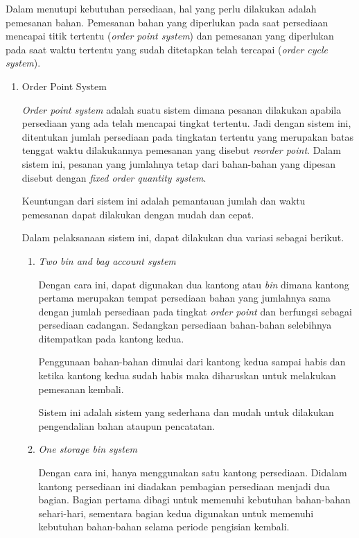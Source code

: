 Dalam menutupi kebutuhan persediaan, hal yang perlu dilakukan adalah pemesanan bahan. Pemesanan bahan yang diperlukan pada saat persediaan mencapai titik tertentu (\textit{order point system}) dan pemesanan yang diperlukan pada saat waktu tertentu yang sudah ditetapkan telah tercapai (\textit{order cycle system}).

\begin{enumerate}
	\item Order Point System
	

	\textit{Order point system} adalah suatu sistem dimana pesanan dilakukan apabila persediaan yang ada telah mencapai tingkat tertentu. Jadi dengan sistem ini, ditentukan jumlah persediaan pada tingkatan tertentu yang merupakan batas tenggat waktu dilakukannya pemesanan yang disebut \textit{reorder point}. Dalam sistem ini, pesanan yang jumlahnya tetap dari bahan-bahan yang dipesan disebut dengan \textit{fixed order quantity system}. 

	Keuntungan dari sistem ini adalah pemantauan jumlah dan waktu pemesanan dapat dilakukan dengan mudah dan cepat.

	Dalam pelaksanaan sistem ini, dapat dilakukan dua variasi sebagai berikut.

	\begin{enumerate}
		\item \textit{Two bin and bag account system}
		
		Dengan cara ini, dapat digunakan dua kantong atau \textit{bin} dimana kantong pertama merupakan tempat persediaan bahan yang jumlahnya sama dengan jumlah persediaan pada tingkat \textit{order point} dan berfungsi sebagai persediaan cadangan. Sedangkan persediaan bahan-bahan selebihnya ditempatkan pada kantong kedua.

		Penggunaan bahan-bahan dimulai dari kantong kedua sampai habis dan ketika kantong kedua sudah habis maka diharuskan untuk melakukan pemesanan kembali.

		Sistem ini adalah sistem yang sederhana dan mudah untuk dilakukan pengendalian bahan ataupun pencatatan.

		\item \textit{One storage bin system}
		
		Dengan cara ini, hanya menggunakan satu kantong persediaan. Didalam kantong persediaan ini diadakan pembagian persediaan menjadi dua bagian. Bagian pertama dibagi untuk memenuhi kebutuhan bahan-bahan sehari-hari, sementara bagian kedua digunakan untuk memenuhi kebutuhan bahan-bahan selama periode pengisian kembali.


\end{enumerate}
\end{enumerate}
